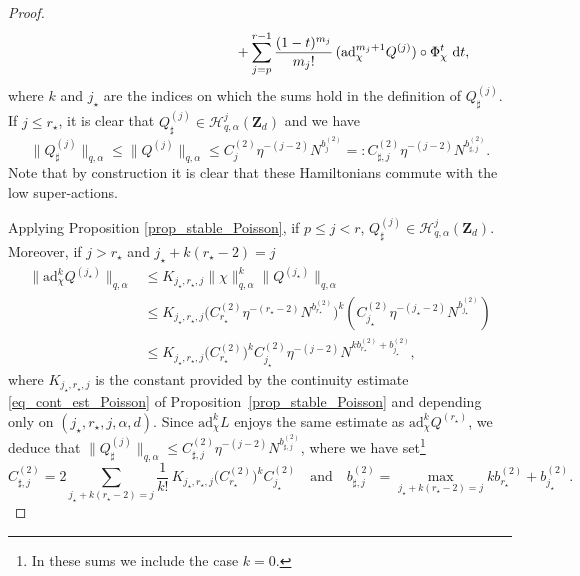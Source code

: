\documentclass[JEP,XML,SOM,Unicode,NoEqCountersInSection,published]{cedram}
\theoremstyle{definition}
\begin{document}
\begin{proof}
\begin{align*}
&\hspace*{5cm}+ \sum_{j=p}^{r-1} \frac{(1-t)^{m_j}}{m_j !}\, (\mathrm{ad}_{\chi}^{m_j+1} Q^{(j)}) \circ \Phi_\chi^t \ \mathrm{d}t,
\end{align*}
where $k$ and $j_\star$ are the indices on which the sums hold in the definition of $Q^{(j)}_\sharp$.\\
If $j\leq r_\star$, it is clear that $Q^{(j)}_\sharp \in \mathscr{H}_{q,\alpha}^{j}(\mathbf{Z}_d)$ and we have\vspace*{-3pt}
\[
\| Q^{(j)}_\sharp \|_{q,\alpha} \leq \| Q^{(j)} \|_{q,\alpha} \leq C_{j}^{(2)} \eta^{-(j-2)} N^{b_j^{(2)}} =: C_{\sharp,j}^{(2)} \eta^{-(j-2)} N^{b_{\sharp,j}^{(2)}}.
\]
Note that by construction it is clear that these Hamiltonians commute with the low super-actions.

Applying Proposition \ref{prop_stable_Poisson}, if $p\leq j< r$, $Q^{(j)}_\sharp \in \mathscr{H}_{q,\alpha}^{j}(\mathbf{Z}_d)$. Moreover, if $j>r_\star$ and $j_\star+k(r_\star - 2)= j$
\begin{equation*}
\begin{split}
\! \! \! \! \! \! \| \mathrm{ad}_{\chi}^k Q^{(j_\star)} \|_{q,\alpha} & \leq K_{j_\star,r_\star,j} \| \chi \|_{q,\alpha}^k \| Q^{(j_\star)} \|_{q,\alpha} \\
&\leq K_{j_\star,r_\star,j} \big(C_{r_\star}^{(2)} \eta^{-(r_\star-2)} N^{b_{r_\star}^{(2)}} \big)^k (C_{j_\star}^{(2)} \eta^{-(j_\star-2)} N^{b_{j_\star}^{(2)}}) \\
&\leq K_{j_\star,r_\star,j} \big(C_{r_\star}^{(2)} \big)^k C_{j_\star}^{(2)} \eta^{-(j-2)} N^{kb_{r_\star}^{(2)} + b_{j_\star}^{(2)} },
\end{split}
\end{equation*}
where $K_{j_\star,r_\star,j}$ is the constant provided by the continuity estimate \eqref{eq_cont_est_Poisson} of Proposition~\ref{prop_stable_Poisson} and depending only on $(j_\star,r_\star,j,\alpha,d)$. Since $\mathrm{ad}_{\chi}^k L$ enjoys the same estimate as $\mathrm{ad}_{\chi}^k Q^{(r_\star)}$, we deduce that $\| Q^{(j)}_\sharp \|_{q,\alpha} \leq C_{\sharp,j}^{(2)} \eta^{-(j-2)} N^{b_{\sharp,j}^{(2)}}$, where we have set\footnote{In these sums we include the case $k=0$.}
\[
C_{\sharp,j}^{(2)} = 2 \! \! \! \sum_{ j_\star+k(r_\star - 2)= j} \frac1{k !}\, K_{j_\star,r_\star,j} \big(C_{r_\star}^{(2)} \big)^k C_{j_\star}^{(2)} \quad \text{and} \quad b_{\sharp,j}^{(2)} = \max_{j_\star+k(r_\star - 2)= j} kb_{r_\star}^{(2)} + b_{j_\star}^{(2)}.
\]


\end{proof}
\end{document}
